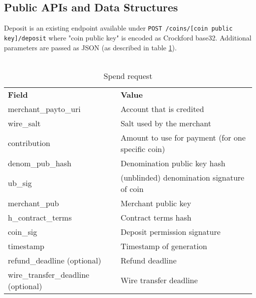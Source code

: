 \subsection{Public APIs and Data Structures}
Deposit is an existing endpoint available under \texttt{POST /coins/[coin public key]/deposit} where "coin public key" is encoded as Crockford base32.
Additional parameters are passed as JSON (as described in table \ref{tab:spend-request}).\\\\
\begin{table}[ht]
  \centering
  \setupBfhTabular
  \begin{tabular}{ll}
      \rowcolor{BFH-tablehead}
      \textbf{Field} & \textbf{Value} \\
      merchant\_payto\_uri & Account that is credited  \\
      wire\_salt & Salt used by the merchant \\
      contribution & Amount to use for payment (for one specific coin) \\
      denom\_pub\_hash & Denomination public key hash \\
      ub\_sig & (unblinded) denomination signature of coin \\
      merchant\_pub & Merchant public key \\
      h\_contract\_terms & Contract terms hash \\
      coin\_sig & Deposit permission signature \\
      timestamp & Timestamp of generation \\
      refund\_deadline (optional) & Refund deadline \\
      wire\_transfer\_deadline (optional) & Wire transfer deadline \\
  \end{tabular}
  \caption{Spend request}
  \label{tab:spend-request}
\end{table}

